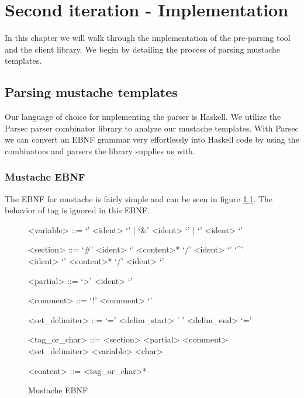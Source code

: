 \chapter{Second iteration - Implementation}
\label{chap:impl}

In this chapter we will walk through the implementation of the pre-parsing tool
and the client library. We begin by detailing the process of parsing
mustache templates.

\section{Parsing mustache templates}

Our language of choice for implementing the parser is Haskell.
We utilize the Parsec parser combinator library to analyze our mustache
templates. With Parsec we can convert an EBNF grammar very effortlessly
into Haskell code by using the combinators and parsers the library supplies
us with.

\subsection{Mustache EBNF}
The EBNF for mustache is fairly simple and can be seen in figure
\ref{fig:mustache.ebnf}.
The behavior of  tag is ignored in this EBNF.

\begin{figure}
	\centering
	\caption{Mustache EBNF}
	\label{fig:mustache.ebnf}
	\setlength{\grammarindent}{3.5cm}
	\begin{grammar}
<variable> ::= `{{{' <ident> `}}}' | `{{&' <ident> `}}' | `{{' <ident> `}}'

<section> ::= `{{#' <ident> `}}' <content>* `{{/' <ident> `}}'
         \alt `{{^' <ident> `}}' <content>* `{{/' <ident> `}}'

<partial> ::= `{{>' <ident> `}}'

<comment> ::= `{{!' <comment> `}}'

<set\_delimiter> ::= `{{=' <delim\_start>  ' ' <delim\_end> `=}}'

<tag\_or\_char> ::= <section>
               \alt <partial>
               \alt <comment>
               \alt <set\_delimiter>
               \alt <variable>
               \alt <char>

<content> ::= <tag\_or\_char>*
	\end{grammar}
\end{figure}

